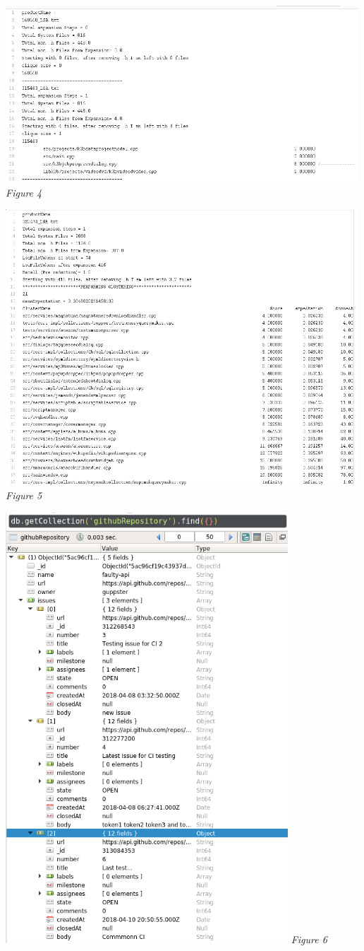 \documentclass[12pt]{article}
\begin{document}
\includegraphics[width=500px]{../images/BLSimple} \emph{Figure 4}

\includegraphics[width=500px]{../images/BLComplex} \emph{Figure 5}

\includegraphics[width=400px]{../images/Robo3t} \emph{Figure 6}
\end{document}

